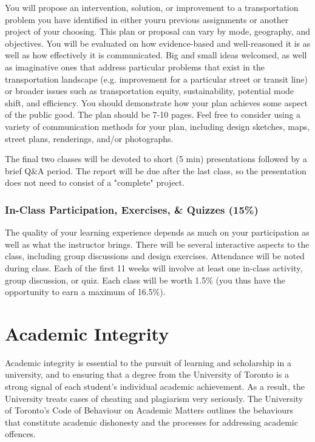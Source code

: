 \documentclass[11pt]{article}
\begin{document}
	You will propose an intervention, solution, or
	improvement to a transportation problem you have identified in either youru previous assignments or another project of your choosing. This plan or proposal can vary by mode, geography, and objectives. You will be evaluated on how evidence-based and well-reasoned it is as well as how effectively it is communicated. Big and small ideas welcomed, as well as imaginative ones that address particular problems that exist in the transportation landscape (e.g. improvement for a particular street or transit line) or broader issues such as transportation equity, sustainability, potential mode shift, and efficiency. You should demonstrate how your plan achieves some aspect of the public good. The plan should be 7-10	pages. Feel free to consider using a variety of communication methods for your plan, including design sketches, maps, street plans, renderings, and/or photographs.
	
	The final two classes will be devoted to short (5 min) presentations followed by a brief Q\&A period. The report will be due after the last class, so the presentation does not need to consist of a "complete" project.
	
	
	
	
	\subsubsection*{In-Class Participation, Exercises, \& Quizzes (15\%)}
	
	The quality of your learning experience depends as much on your participation as well as what the instructor brings. There will be several interactive aspects to the class, including group discussions and design exercises. Attendance will be noted during class. Each of the first 11 weeks will involve at least one in-class activity, group discussion, or quiz. Each class will be worth 1.5\% (you thus have the opportunity to earn a maximum of 16.5\%).
	
	
	
	
	
	\section*{Academic Integrity}
	
	Academic integrity is essential to the pursuit of learning and scholarship in a university, and to ensuring that a degree from the University of Toronto is a strong signal of each student’s individual academic achievement. As a result, the University treats cases of cheating and plagiarism very seriously. The University of Toronto's Code of Behaviour on Academic Matters outlines the behaviours that constitute academic dishonesty and the processes for addressing academic offences. 
	
\end{document}
